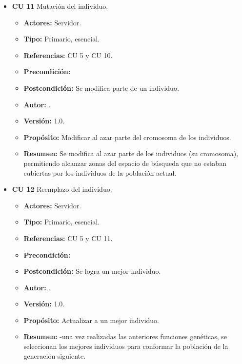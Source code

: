 \begin{itemize}
	\item \textbf{CU 11} Mutación del individuo.
	\begin{itemize}
		\item \textbf{Actores:} Servidor.
		\item \textbf{Tipo:} Primario, esencial.
		\item \textbf{Referencias:} CU 5 y CU 10.
		\item \textbf{Precondición:}
		\item \textbf{Postcondición:} Se modifica parte de un individuo.
		\item\textbf{ Autor:} {\autor}.
		\item \textbf{Versión:} 1.0.
		\item \textbf{Propósito:} Modificar al azar parte del cromosoma de los individuos.
		\item \textbf{Resumen:} Se modifica al azar parte de los individuos (su cromosoma), permitiendo alcanzar zonas del espacio de búsqueda que no estaban cubiertas por los individuos de la población actual.
	\end{itemize}	

	\item \textbf{CU 12} Reemplazo del individuo.
	\begin{itemize}
		\item \textbf{Actores:} Servidor.
		\item \textbf{Tipo:} Primario, esencial.
		\item \textbf{Referencias:} CU 5 y CU 11.
		\item \textbf{Precondición:}
		\item \textbf{Postcondición:} Se logra un mejor individuo.
		\item\textbf{ Autor:} {\autor}.
		\item \textbf{Versión:} 1.0.
		\item \textbf{Propósito:} Actualizar a un mejor individuo.
		\item \textbf{Resumen:} -una vez realizadas las anteriores funciones genéticas, se seleccionan los mejores individuos para conformar la población de la generación siguiente.
	\end{itemize}	


\end{itemize}
